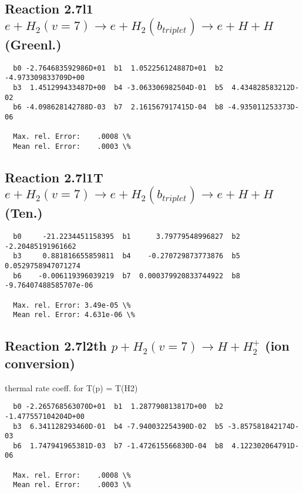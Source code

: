 \documentclass[12pt,dvipdfmx]{article}
\begin{document}
\newpage
\subsection{
Reaction 2.7l1
$ e + H_2(v=7) \rightarrow e + H_2(b_{triplet})\rightarrow e + H + H $ (Greenl.)
}


\begin{small}\begin{verbatim}
  b0 -2.764683592986D+01  b1  1.052256124887D+01  b2 -4.973309833709D+00
  b3  1.451299433487D+00  b4 -3.063306982504D-01  b5  4.434828583212D-02
  b6 -4.098628142788D-03  b7  2.161567917415D-04  b8 -4.935011253373D-06

  Max. rel. Error:    .0008 \%
  Mean rel. Error:    .0003 \%
\end{verbatim}\end{small}


\subsection{
Reaction 2.7l1T
$ e +  H_2(v=7) \rightarrow e +  H_2(b_{triplet})\rightarrow e + H + H $ (Ten.)
}


\begin{small}\begin{verbatim}
  b0     -21.2234451158395  b1      3.79779548996827  b2     -2.20485191961662
  b3     0.881816655859811  b4    -0.270729873773876  b5    0.0529758947071274
  b6    -0.006119396039219  b7  0.000379920833744922  b8 -9.76407488585707e-06

  Max. rel. Error: 3.49e-05 \%
  Mean rel. Error: 4.631e-06 \%
\end{verbatim}\end{small}


\subsection{
Reaction 2.7l2th
$ p + H_2(v=7) \rightarrow H + H_2^+$ (ion conversion)
}
thermal rate coeff. for T(p) = T(H2)

\begin{small}\begin{verbatim}
  b0 -2.265768563070D+01  b1  1.287790813817D+00  b2 -1.477557104204D+00
  b3  6.341128293460D-01  b4 -7.940032254390D-02  b5 -3.857581842174D-03
  b6  1.747941965381D-03  b7 -1.472615566830D-04  b8  4.122302064791D-06

  Max. rel. Error:    .0008 \%
  Mean rel. Error:    .0003 \%
\end{verbatim}\end{small}
\end{document}
